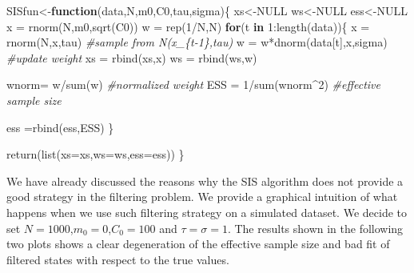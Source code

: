 \documentclass[
]{book}
\newenvironment{Shaded}{\begin{snugshade}}{\end{snugshade}}
\newcommand{\AttributeTok}[1]{\textcolor[rgb]{0.77,0.63,0.00}{#1}}
\newcommand{\CommentTok}[1]{\textcolor[rgb]{0.56,0.35,0.01}{\textit{#1}}}
\newcommand{\ConstantTok}[1]{\textcolor[rgb]{0.00,0.00,0.00}{#1}}
\newcommand{\ControlFlowTok}[1]{\textcolor[rgb]{0.13,0.29,0.53}{\textbf{#1}}}
\newcommand{\DecValTok}[1]{\textcolor[rgb]{0.00,0.00,0.81}{#1}}
\newcommand{\FunctionTok}[1]{\textcolor[rgb]{0.00,0.00,0.00}{#1}}
\newcommand{\NormalTok}[1]{#1}
\newcommand{\OtherTok}[1]{\textcolor[rgb]{0.56,0.35,0.01}{#1}}
\newcommand{\SpecialCharTok}[1]{\textcolor[rgb]{0.00,0.00,0.00}{#1}}
\theoremstyle{break}
\theoremstyle{nonumberplain}
\begin{document}
\begin{Shaded}
\begin{Highlighting}[]
\NormalTok{SISfun}\OtherTok{\textless{}{-}}\ControlFlowTok{function}\NormalTok{(data,N,m0,C0,tau,sigma)\{}
\NormalTok{  xs}\OtherTok{\textless{}{-}}\ConstantTok{NULL}
\NormalTok{  ws}\OtherTok{\textless{}{-}}\ConstantTok{NULL}
\NormalTok{  ess}\OtherTok{\textless{}{-}}\ConstantTok{NULL}
\NormalTok{  x  }\OtherTok{=} \FunctionTok{rnorm}\NormalTok{(N,m0,}\FunctionTok{sqrt}\NormalTok{(C0))}
\NormalTok{  w  }\OtherTok{=} \FunctionTok{rep}\NormalTok{(}\DecValTok{1}\SpecialCharTok{/}\NormalTok{N,N)}
  \ControlFlowTok{for}\NormalTok{(t }\ControlFlowTok{in} \DecValTok{1}\SpecialCharTok{:}\FunctionTok{length}\NormalTok{(data))\{}
\NormalTok{    x    }\OtherTok{=} \FunctionTok{rnorm}\NormalTok{(N,x,tau)                   }\CommentTok{\#sample from N(x\_\{t{-}1\},tau)}
\NormalTok{    w    }\OtherTok{=}\NormalTok{ w}\SpecialCharTok{*}\FunctionTok{dnorm}\NormalTok{(data[t],x,sigma)         }\CommentTok{\#update weight}
\NormalTok{    xs }\OtherTok{=} \FunctionTok{rbind}\NormalTok{(xs,x)}
\NormalTok{    ws }\OtherTok{=} \FunctionTok{rbind}\NormalTok{(ws,w)}
    
\NormalTok{    wnorm}\OtherTok{=}\NormalTok{ w}\SpecialCharTok{/}\FunctionTok{sum}\NormalTok{(w)                         }\CommentTok{\#normalized weight}
\NormalTok{    ESS  }\OtherTok{=} \DecValTok{1}\SpecialCharTok{/}\FunctionTok{sum}\NormalTok{(wnorm}\SpecialCharTok{\^{}}\DecValTok{2}\NormalTok{)                   }\CommentTok{\#effective sample size}
    
\NormalTok{    ess }\OtherTok{=}\FunctionTok{rbind}\NormalTok{(ess,ESS)}
\NormalTok{  \}}
  
  \FunctionTok{return}\NormalTok{(}\FunctionTok{list}\NormalTok{(}\AttributeTok{xs=}\NormalTok{xs,}\AttributeTok{ws=}\NormalTok{ws,}\AttributeTok{ess=}\NormalTok{ess))}
\NormalTok{\}}
\end{Highlighting}
\end{Shaded}

We have already discussed the reasons why the SIS algorithm does not
provide a good strategy in the filtering problem. We provide a graphical
intuition of what happens when we use such filtering strategy on a
simulated dataset. We decide to set \(N=1000\),\(m_{0}=0\),\(C_{0}=100\)
and \(\tau=\sigma=1\). The results shown in the following two plots
shows a clear degeneration of the effective sample size and bad fit of
filtered states with respect to the true values.
\end{document}
